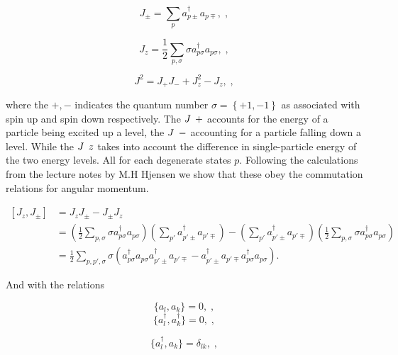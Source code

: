 \begin{equation}
J_{\pm} = \sum_p a_{p\pm}^\dagger a_{p\mp},
\label{eq:Jpm} \;, 
\end{equation}

\begin{equation} 
J_{z} = \frac{1}{2}\sum_{p,\sigma} \sigma a_{p\sigma}^\dagger a_{p\sigma},
\label{eq:Jz}\; , 
\end{equation}

\begin{equation} 
J^{2} = J_+ J_- + J_z^2 - J_z,
\label{eq:J2} \; ,
\end{equation}

where the $+, -$ indicates the quantum number $\sigma = \left \{ +1, -1\right \}$ as associated with spin up and spin down respectively. The $\op{J}{+}$ accounts for the energy of a particle being excited up a level, the $\op{J}{-}$ accounting for a particle falling down a level. While the $\op{J}{z}$ takes into account the difference in single-particle energy of the two energy levels. All for each degenerate states $p$. Following the calculations from the lecture notes by M.H Hjensen\cite{LipkinRewrite} we show that these obey the commutation relations for angular momentum. 

$$\begin{align*}
[J_z,J_\pm] &= J_z J_\pm - J_\pm J_z \\
%
&= \left( \frac{1}{2}\sum_{p,\sigma} \sigma a_{p\sigma}^\dagger a_{p\sigma} \right)
\left( \sum_{p'} a_{p'\pm}^\dagger a_{p'\mp} \right) -
\left( \sum_{p'} a_{p'\pm}^\dagger a_{p'\mp} \right)
\left( \frac{1}{2}\sum_{p,\sigma} \sigma a_{p\sigma}^\dagger a_{p\sigma} \right) \\
&= \frac{1}{2} \sum_{p,p',\sigma} \sigma \left( a_{p\sigma}^\dagger a_{p\sigma} a_{p'\pm}^\dagger a_{p'\mp} - a_{p'\pm}^\dagger a_{p'\mp} a_{p\sigma}^\dagger a_{p\sigma} \right).
\end{align*}$$

And with the relations

\begin{equation}
\{ a_l,a_k \} = 0, \label{eq:al,ak} \; ,
\end{equation}
\begin{equation} 
\{ a_l^\dagger , a_k^\dagger \} = 0, \label{eq:ald,akd}\;, 
\end{equation}

\begin{equation} 
\{ a_l^\dagger , a_k \} = \delta_{lk}, \label{eq:ald,ak} \;,
\end{equation}

